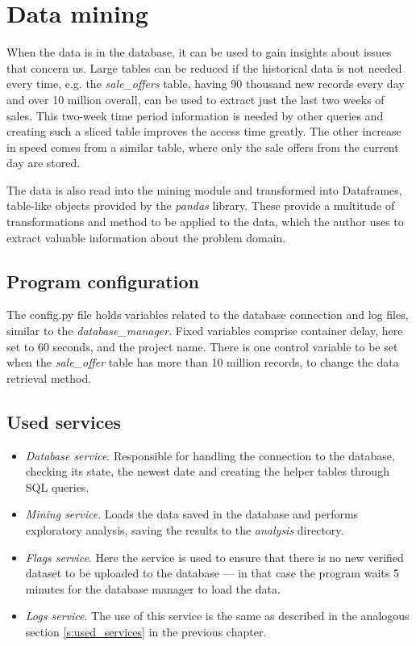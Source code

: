 \section{Data mining}
When the data is in the database, it can be used to gain insights about issues that concern us. Large tables can be reduced if the historical data is not needed every time, e.g. the \textit{sale\_offers} table, having 90 thousand new records every day and over 10 million overall, can be used to extract just the last two weeks of sales. This two-week time period information is needed by other queries and creating such a sliced table improves the access time greatly. The other increase in speed comes from a similar table, where only the sale offers from the current day are stored. \par
The data is also read into the mining module and transformed into Dataframes, table-like objects provided by the \textit{pandas} library. These provide a multitude of transformations and method to be applied to the data, which the author uses to extract valuable information about the problem domain.


\subsection{Program configuration}
The config.py file holds variables related to the database connection and log files, similar to the \textit{database\_manager}. Fixed variables comprise container delay, here set to 60 seconds, and the project name. There is one control variable to be set when the \textit{sale\_offer} table has more than 10 million records, to change the data retrieval method.


\subsection{Used services}
\begin{itemize}
    \item \textit{Database service}.
          Responsible for handling the connection to the database, checking its state, the newest date and creating the helper tables through SQL queries.

    \item \textit{Mining service}.
          Loads the data saved in the database and performs exploratory analysis, saving the results to the \textit{analysis} directory.

    \item \textit{Flags service}.
          Here the service is used to ensure that there is no new verified dataset to be uploaded to the database --- in that case the program waits 5 minutes for the database manager to load the data.

    \item \textit{Logs service}.
          The use of this service is the same as described in the analogous section \ref{s:used_services} in the previous chapter.
\end{itemize}

